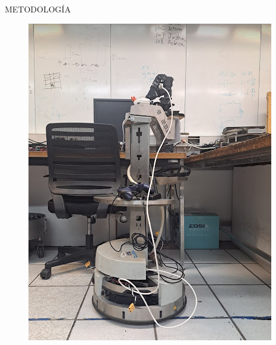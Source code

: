 \documentclass[handout,t]{beamer}
\begin{document}
\begin{frame}{METODOLOGÍA}
\begin{figure}[htp]
    \centering
    \includegraphics[scale=0.35]{NewerFigures/phantom+table.png} 
\end{figure}
\end{frame}
\end{document}
